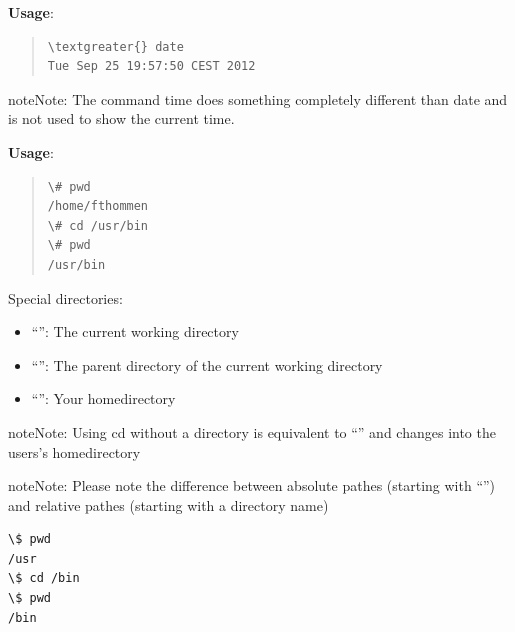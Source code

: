 \documentclass[letterpaper,10pt,english]{sphinxmanual}
\begin{document}
\textbf{Usage}: 
\begin{quote}

\begin{Verbatim}[commandchars=\\\{\}]
\textgreater{} date
Tue Sep 25 19:57:50 CEST 2012
\end{Verbatim}
\end{quote}

\begin{notice}{note}{Note:}
The command time does something completely different than date and is not used to show the current time.
\end{notice}

\textbf{Usage}: 
\begin{quote}

\begin{Verbatim}[commandchars=\\\{\}]
\# pwd
/home/fthommen
\# cd /usr/bin
\# pwd
/usr/bin
\end{Verbatim}
\end{quote}

Special directories:
\begin{itemize}
\item {} 
“”:  The current working directory

\item {} 
“”: The parent directory of the current working directory

\item {} 
“\code{\textasciitilde{}}”:  Your homedirectory

\end{itemize}

\begin{notice}{note}{Note:}
Using cd without a directory is equivalent to “” and changes into the users’s homedirectory
\end{notice}

\begin{notice}{note}{Note:}
Please note the difference between absolute pathes (starting with ``\code{/}'') and relative pathes (starting with a directory name)
\end{notice}

\begin{Verbatim}[commandchars=\\\{\}]
\$ pwd
/usr
\$ cd /bin
\$ pwd
/bin
\end{Verbatim}
\end{document}

